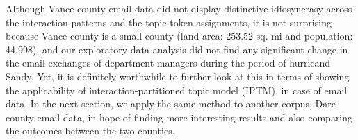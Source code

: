 \documentclass[a4paper]{article}
\begin{document}
\normalsize
\begin{table}[ht]
	\centering
		\caption {Summary of top 10 words that have the highest probability conditioned on the interaction patterns}
		\label{table:VancewordsMCMC2}
	\end{table}
	\normalsize
\newline
Although Vance county email data did not display distinctive idiosyncrasy across the interaction patterns and the topic-token assignments, it is not surprising because Vance county is a small county (land area: 253.52 sq. mi and population: 44,998), and our exploratory data analysis did not find any significant change in the email exchanges of department managers during the period of hurricand Sandy. Yet, it is definitely worthwhile to further look at this in terms of showing the applicability of interaction-partitioned topic model (IPTM), in case of email data. In the next section, we apply the same method to another corpus, Dare county email data, in hope of finding more interesting results and also comparing the outcomes between the two counties.
\end{document}
